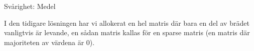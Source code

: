 




Svårighet: Medel

I den tidigare lösningen har vi allokerat en hel matris där bara en del av brädet vanligtvis är levande, en sådan matris kallas för en sparse matris (en matris där majoriteten av värdena är 0).



